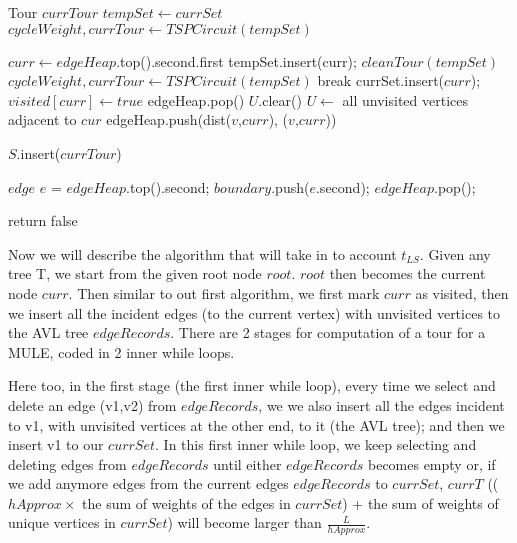 \begin{algorithm}
\begin{algorithmic}
	
	\State Tour $currTour$ 
	\State $tempSet \gets currSet$ 
	\State $cycleWeight , currTour \gets TSPCircuit(tempSet)$

		\State $curr \gets edgeHeap$.top().second.first 
		\State tempSet.insert(curr);
		\State $cleanTour(tempSet)$
		\State $cycleWeight, currTour \gets TSPCircuit(tempSet)$ 
			\State break 
		\EndIf
		\State currSet.insert($curr$);
		\State $visited[curr] \gets true$ 
		\State edgeHeap.pop() 
		\State $U$.clear() 
		\State $U  \gets$ all unvisited vertices adjacent to $cur$ 
			\State edgeHeap.push(dist($v$,$curr$), ($v$,$curr$)) 
		\EndFor
	\EndWhile
	
	\State $S$.insert($currTour$) 

		\State $edge$ $e$ = $edgeHeap$.top().second;
		\State $boundary$.push($e$.second);
		\State $edgeHeap$.pop();
	\EndWhile
	
		\State return false 
	\EndIf

\EndWhile
\EndFunction

\EndFunction

\end{algorithmic}
\end{algorithm}

\pagebreak

Now we will describe the algorithm that will take in to account $t_{LS}$. Given any tree T, we start from the given root node $root$. $root$ then becomes the current node $curr$. Then similar to out first algorithm, we first mark $curr$ as visited, then we insert all the incident edges (to the current vertex) with unvisited vertices to the AVL tree $edgeRecords$. There are 2 stages for computation of a tour for a MULE, coded in 2 inner while loops.

Here too, in the first stage (the first inner while loop), every time we select and delete an edge (v1,v2) from $edgeRecords$, we we also insert all the edges incident to v1, with unvisited vertices at the other end, to it (the AVL tree); and then we insert v1 to our $currSet$. In this first inner while loop, we keep selecting and deleting edges from $edgeRecords$ until either $edgeRecords$ becomes empty or, if we add anymore edges from the current edges $edgeRecords$ to $currSet$, $currT$ (($hApprox\times$ the sum of weights of the edges in $currSet$) + the sum of weights of unique vertices in $currSet$) will become larger than $\frac{L}{hApprox}$.

